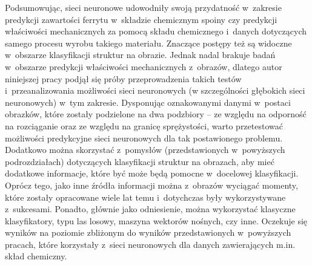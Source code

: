 Podsumowując, sieci neuronowe udowodniły swoją przydatność w~zakresie predykcji zawartości ferrytu w~składzie chemicznym spoiny czy predykcji właściwości mechanicznych za pomocą składu chemicznego i~danych dotyczących samego procesu wyrobu takiego materiału. Znaczące postępy też są widoczne w~obszarze klasyfikacji struktur na obrazie. Jednak nadal brakuje badań w~obszarze predykcji właściwości mechanicznych z~obrazów, dlatego autor niniejszej pracy podjął się próby przeprowadzenia takich testów i~przeanalizowania możliwości sieci neuronowych (w szczególności głębokich sieci neuronowych) w~tym zakresie. Dysponując oznakowanymi danymi w~postaci obrazków, które zostały podzielone na dwa podzbiory –  ze względu na odporność na rozciąganie oraz ze względu na granicę sprężystości, warto przetestować możliwości predykcyjne sieci neuronowych dla tak postawionego problemu. Dodatkowo można skorzystać z~pomysłów (przedstawionych w~powyższych podrozdziałach) dotyczących klasyfikacji struktur na obrazach, aby mieć dodatkowe informacje, które być może będą pomocne w~docelowej klasyfikacji. Oprócz tego, jako inne źródła informacji można z~obrazów wyciągać momenty, które zostały opracowane wiele lat temu i~dotychczas były wykorzystywane z~sukcesami. Ponadto, głównie jako odniesienie, można wykorzystać klasyczne klasyfikatory, typu las losowy, maszyna wektorów nośnych, czy inne. Oczekuje się wyników na poziomie zbliżonym do wyników przedstawionych w~powyższych pracach, które korzystały z~sieci neuronowych dla danych zawierających m.in. skład chemiczny.  







